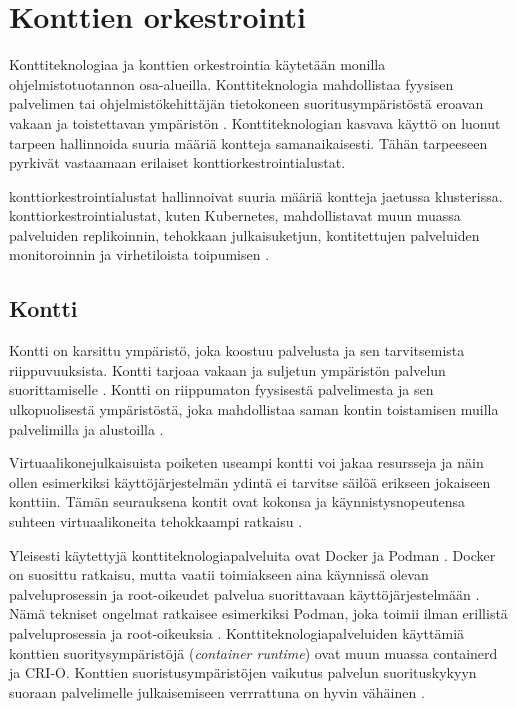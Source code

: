 \chapter{Konttien orkestrointi\label{orchestration}}

Konttiteknologiaa ja konttien orkestrointia käytetään monilla ohjelmistotuotannon osa-alueilla.
Konttiteknologia mahdollistaa fyysisen palvelimen tai ohjelmistökehittäjän tietokoneen suoritusympäristöstä eroavan vakaan ja toistettavan ympäristön \cite{Watada19}.
Konttiteknologian kasvava käyttö on luonut tarpeen hallinnoida suuria määriä kontteja samanaikaisesti.
Tähän tarpeeseen pyrkivät vastaamaan erilaiset konttiorkestrointialustat.

konttiorkestrointialustat hallinnoivat suuria määriä kontteja jaetussa klusterissa.
konttiorkestrointialustat, kuten Kubernetes, mahdollistavat muun muassa palveluiden replikoinnin, tehokkaan julkaisuketjun, kontitettujen palveluiden monitoroinnin ja virhetiloista toipumisen \cite{Khan17}.


\section{Kontti\label{container}}


Kontti on karsittu ympäristö, joka koostuu palvelusta ja sen tarvitsemista riippuvuuksista.
Kontti tarjoaa vakaan ja suljetun ympäristön palvelun suorittamiselle \cite{Watada19}.
Kontti on riippumaton fyysisestä palvelimesta ja sen ulkopuolisestä ympäristöstä, joka mahdollistaa saman kontin toistamisen muilla palvelimilla ja alustoilla \cite{Saha18}.

Virtuaalikonejulkaisuista poiketen useampi kontti voi jakaa resursseja ja näin ollen esimerkiksi käyttöjärjestelmän ydintä ei tarvitse säilöä erikseen jokaiseen konttiin.
Tämän seurauksena kontit ovat kokonsa ja käynnistysnopeutensa suhteen virtuaalikoneita tehokkaampi ratkaisu \cite{Dua14}.


Yleisesti käytettyjä konttiteknologiapalveluita ovat Docker ja Podman \cite{Abraham20, Bernstein14}.
Docker on suosittu ratkaisu, mutta vaatii toimiakseen aina käynnissä olevan palveluprosessin ja root-oikeudet palvelua suorittavaan käyttöjärjestelmään \cite{Abraham20}.
Nämä tekniset ongelmat ratkaisee esimerkiksi Podman, joka toimii ilman erillistä palveluprosessia ja root-oikeuksia \cite{Gantikow20}.
Konttiteknologiapalveluiden käyttämiä konttien suoritysympäristöjä (\textit{container runtime}) ovat muun muassa containerd ja CRI-O.
Konttien suoristusympäristöjen vaikutus palvelun suorituskykyyn suoraan palvelimelle julkaisemiseen verrrattuna on hyvin vähäinen \cite{torrez19, espe20}.

